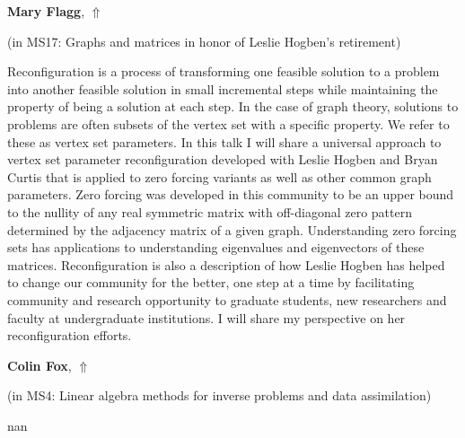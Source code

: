\documentclass[ILAS2025-program.tex]{subfiles}
\begin{document}
\hypertarget{down0375}{}\begin{ilasabstract}
    
\textbf{Mary Flagg},  \hfill \hyperlink{up0375}{$\Uparrow$}
    
    
(in {\color{mstitle}MS17: Graphs and matrices in honor of Leslie Hogben's retirement})
        
\mtskip
    Reconfiguration is a process of transforming one feasible solution to a problem into another feasible solution in small incremental steps while maintaining the property of being a solution at each step. In the case of graph theory, solutions to problems are often subsets of the vertex set with a specific property. We refer to these as vertex set parameters. In this talk I will share a universal approach to vertex set parameter reconfiguration developed with Leslie Hogben and Bryan Curtis that is applied to zero forcing variants as well as other common graph parameters. Zero forcing was developed in this community to be an upper bound to the nullity of any real symmetric matrix with off-diagonal zero pattern determined by the adjacency matrix of a given graph. Understanding zero forcing sets has applications to understanding eigenvalues and eigenvectors of these matrices. 
Reconfiguration is also a description of how Leslie Hogben has helped to change our community for the better, one step at a time by facilitating community and research opportunity to graduate students, new researchers and faculty at undergraduate institutions. I will share my perspective on her reconfiguration efforts.

\end{ilasabstract}
    

\hypertarget{down0314}{}\begin{ilasabstract}
    
\textbf{Colin Fox},  \hfill \hyperlink{up0314}{$\Uparrow$}
    
    
(in {\color{mstitle}MS4: Linear algebra methods for inverse problems and data assimilation})
        
\mtskip
    nan
\end{ilasabstract}
    
\end{document}
